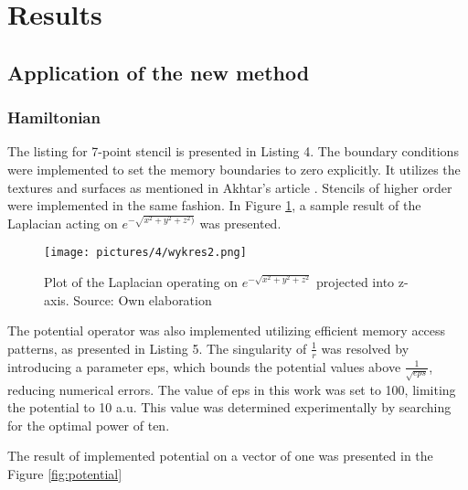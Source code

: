 \section{Results}

\subsection{Application of the new method}

\subsubsection{Hamiltonian}

 The listing for 7-point stencil is presented in Listing 4. The boundary conditions were implemented to set the memory boundaries to zero explicitly. It utilizes the textures and surfaces as mentioned in Akhtar's article \cite{akhtar2018efficient}. Stencils of higher order were implemented in the same fashion. In Figure \ref{fig:laplacian}, a sample result of the Laplacian acting on $e^{-\sqrt{x^2+y^2+z^2)}}$ was presented.

\vspace{0.2cm}


\begin{figure}[h]
	\centering
	\texttt{[image: pictures/4/wykres2.png]}
	\caption{Plot of the Laplacian operating on $e^{-\sqrt{x^2+y^2+z^2	}}$ projected into z-axis. Source: Own elaboration}
	\label{fig:laplacian}
\end{figure}

The potential operator was also implemented utilizing efficient memory access patterns, as presented in Listing 5. The singularity of $\frac{1}{r}$ was resolved by introducing a parameter eps, which bounds the potential values above $\frac{1}{\sqrt{eps}}$, reducing numerical errors. The value of eps in this work was set to 100, limiting the potential to 10 a.u. This value was determined experimentally by searching for the optimal power of ten.
\newpage

\vspace{0.2cm}


The result of implemented potential on a vector of one was presented in the Figure \ref{fig:potential}

